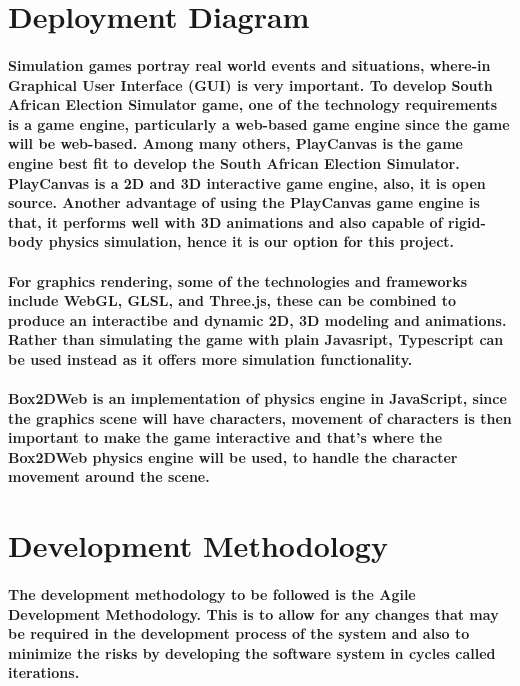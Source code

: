 \documentclass{article}
\begin{document}
\section{Deployment Diagram}

\paragraph{Simulation games  portray real world events and situations, where-in Graphical User Interface (GUI) is very important. To develop South African
Election Simulator game, one of the technology requirements is a game engine, particularly a web-based game engine since the game will be web-based. Among 
many others, PlayCanvas is the game engine best fit to develop the South African Election Simulator. PlayCanvas is a 2D and 3D interactive game engine, also, 
it is open source. Another advantage of using the PlayCanvas game engine is that, it performs well with 3D animations and also capable of rigid-body physics simulation,  hence it is our option for this project.}

\paragraph{For graphics rendering, some of the technologies and frameworks include WebGL, GLSL, and Three.js, these can be combined to produce an interactibe and dynamic 2D, 3D modeling and animations.
Rather than simulating the game with plain Javasript, Typescript can be used instead as it offers more simulation functionality.}

\paragraph{Box2DWeb is an implementation of physics engine in JavaScript, since the graphics scene will have characters, movement of characters is
then important to make the game interactive and that's where the Box2DWeb physics engine will be used, to handle the character movement around the scene.}

\section{Development Methodology}

\paragraph{The development methodology to be followed is the Agile Development Methodology. This is to allow for any changes that may be required in the development process of the system and also to minimize the risks by developing the software system in cycles called iterations.}
\end{document}
